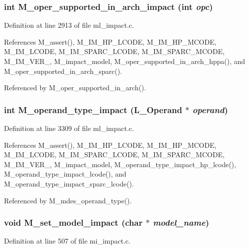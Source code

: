 \subsubsection{\setlength{\rightskip}{0pt plus 5cm}int M\_\-oper\_\-supported\_\-in\_\-arch\_\-impact (int {\em opc})}\label{m__impact_8h_dc11d8be06a626bed81c4561060ec8fa}




Definition at line 2913 of file ml\_\-impact.c.

References M\_\-assert(), M\_\-IM\_\-HP\_\-LCODE, M\_\-IM\_\-HP\_\-MCODE, M\_\-IM\_\-LCODE, M\_\-IM\_\-SPARC\_\-LCODE, M\_\-IM\_\-SPARC\_\-MCODE, M\_\-IM\_\-VER\_, M\_\-impact\_\-model, M\_\-oper\_\-supported\_\-in\_\-arch\_\-hppa(), and M\_\-oper\_\-supported\_\-in\_\-arch\_\-sparc().

Referenced by M\_\-oper\_\-supported\_\-in\_\-arch().
\subsubsection{\setlength{\rightskip}{0pt plus 5cm}int M\_\-operand\_\-type\_\-impact (L\_\-Operand $\ast$ {\em operand})}\label{m__impact_8h_992eb8e949512feb4f789e105b6bc110}




Definition at line 3309 of file ml\_\-impact.c.

References M\_\-assert(), M\_\-IM\_\-HP\_\-LCODE, M\_\-IM\_\-HP\_\-MCODE, M\_\-IM\_\-LCODE, M\_\-IM\_\-SPARC\_\-LCODE, M\_\-IM\_\-SPARC\_\-MCODE, M\_\-IM\_\-VER\_, M\_\-impact\_\-model, M\_\-operand\_\-type\_\-impact\_\-hp\_\-lcode(), M\_\-operand\_\-type\_\-impact\_\-lcode(), and M\_\-operand\_\-type\_\-impact\_\-sparc\_\-lcode().

Referenced by M\_\-mdes\_\-operand\_\-type().
\subsubsection{\setlength{\rightskip}{0pt plus 5cm}void M\_\-set\_\-model\_\-impact (char $\ast$ {\em model\_\-name})}\label{m__impact_8h_b53e45240630637ce4d87a4e60338881}




Definition at line 507 of file mi\_\-impact.c.

